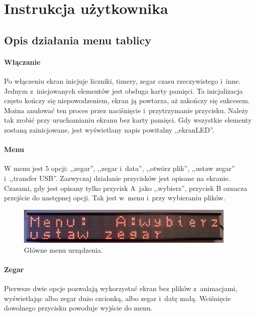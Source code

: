 \chapter{Instrukcja użytkownika}

\section{Opis działania menu tablicy}

\subsubsection*{Włączanie}
Po włączeniu ekran inicjuje liczniki, timery, zegar czasu rzeczywistego i~inne. Jednym z~inicjowanych elementów jest obsługa karty pamięci. Ta inicjalizacja często kończy się niepowodzeniem, ekran ją powtarza, aż zakończy się sukcesem. Można anulować ten proces przez naciśnięcie i~przytrzymanie przycisku. Należy tak zrobić przy uruchamianiu ekranu bez karty pamięci. Gdy wszystkie elementy zostaną zainicjowane, jest wyświetlany napis powitalny ,,ekranLED''. 

\subsubsection*{Menu}
W menu jest 5 opcji: ,,zegar'', ,,zegar i~data'', ,,otwórz plik'', ,,ustaw zegar'' i~,,transfer USB''. Zazwyczaj działanie przycisków jest opisane na ekranie. Czasami, gdy jest opisany tylko przycisk A~jako ,,wybierz'', przycisk B oznacza przejście do następnej opcji. Tak jest w~menu i~przy wybieraniu plików.

\begin{figure}[htb]
	\begin{center}
		\includegraphics[width=300pt]{figures/screenmenu.png}
	\end{center}
	\caption{Główne menu urządzenia.}
\end{figure}

\subsubsection*{Zegar}
Pierwsze dwie opcje pozwalają wykorzystać ekran bez plików z~animacjami, wyświetlając albo zegar dużo czcionką, albo zegar i~datę małą. Wciśnięcie dowolnego przycisku powoduje wyjście do menu.

